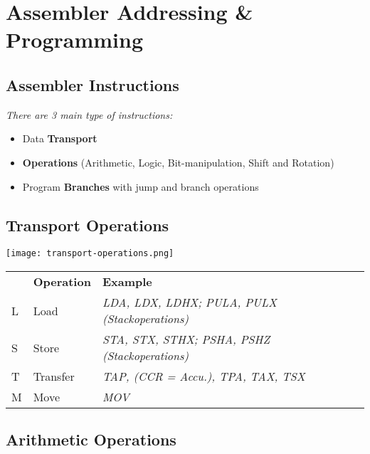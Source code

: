\section{Assembler Addressing \& Programming}

\subsection{Assembler Instructions}

\textit{
    There are 3 main type of instructions:
}

\begin{itemize}
    \item{Data \textbf{Transport}}
    \item{\textbf{Operations} (Arithmetic, Logic, Bit-manipulation, Shift and Rotation)}
    \item{Program \textbf{Branches} with jump and branch operations}
\end{itemize}

\subsection{Transport Operations}

\texttt{[image: transport-operations.png]}

\begin{tabular}{llp{}}
      & \textbf{Operation} & \textbf{Example} \\
    L & Load     & \textit{LDA, LDX, LDHX; PULA, PULX (Stackoperations)} \\
    S & Store    & \textit{STA, STX, STHX; PSHA, PSHZ (Stackoperations)} \\
    T & Transfer & \textit{TAP, (CCR = Accu.), TPA, TAX, TSX} \\
    M & Move     & \textit{MOV} \\
\end{tabular}

\subsection{Arithmetic Operations}

